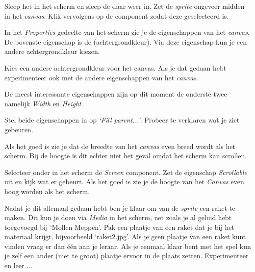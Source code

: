 \begin{opgave}
    \opgVraag
  Sleep het  in het scherm en sleep de  daar weer in. Zet de \emph{sprite} ongeveer midden in het \emph{canvas}. Klik vervolgens op de  component zodat deze geselecteerd is.
\end{opgave}

In het \emph{Properties} gedeelte van het  scherm zie je de eigenschappen van het \emph{canvas}. De bovenste eigenschap is de  (achtergrondkleur). Via deze eigenschap kun je een andere achtergrondkleur kiezen.

\begin{opgave}
    \opgVraag
  Kies een andere achtergrondkleur voor het canvas. Als je dat gedaan hebt experimenteer ook met de andere eigenschappen van het \emph{canvas}.
\end{opgave}

De meest interessante eigenschappen zijn op dit moment de onderste twee namelijk \emph{Width} en \emph{Height}.

\begin{opgave}
    \opgVraag
  Stel beide eigenschappen in op \emph{`Fill parent...'}. Probeer te verklaren wat je ziet gebeuren.
\end{opgave}

Als het goed is zie je dat de breedte van het \emph{canvas} even breed wordt als het scherm. Bij de hoogte is dit echter niet het geval omdat het scherm kan scrollen.

\begin{opgave}
    \opgVraag
  Selecteer onder  in het  scherm de \emph{Screen} component. Zet de eigenschap \emph{Scrollable} uit en kijk wat er gebeurt. Als het goed is zie je de hoogte van het \emph{Canvas} even hoog worden als het scherm.
\end{opgave}

Nadat je dit allemaal gedaan hebt ben je klaar om van de \emph{sprite} een raket te maken. Dit kun je doen via \emph{Media} in het  scherm, net zoals je al geluid hebt toegevoegd bij `Mollen Meppen'. Pak een plaatje van een raket dat je bij het materiaal krijgt, bijvoorbeeld `raket2.jpg'. Als je geen plaatje van een raket kunt vinden vraag er dan \'e\'en aan je leraar. Als je eenmaal klaar bent met het spel kun je zelf een ander (niet te groot) plaatje ervoor in de plaats zetten. Experimenteer en leer ... 

